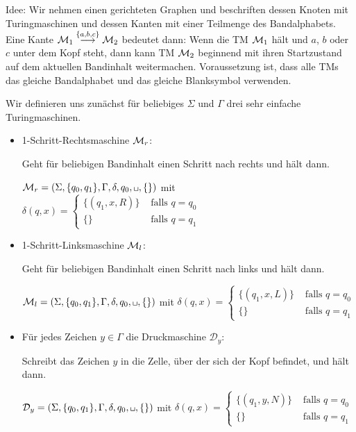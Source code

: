 Idee: Wir nehmen einen gerichteten Graphen und beschriften dessen Knoten mit Turingmaschinen und dessen Kanten mit einer Teilmenge des Bandalphabets.
Eine Kante $\mathcal{M}_1\stackrel{\{a,b,c\}}{\longrightarrow}\mathcal{M}_2$ bedeutet dann:
Wenn die \ac{TM} $\mathcal{M}_1$ hält und $a$, $b$ oder $c$ unter dem Kopf steht, dann kann \ac{TM} $\mathcal{M}_2$ beginnend mit ihren Startzustand auf dem aktuellen Bandinhalt weitermachen.
Voraussetzung ist, dass alle \ac{TM}s das gleiche Bandalphabet und das gleiche Blanksymbol verwenden.

\begin{Bsp}\label{bsp:simpletms} Wir definieren uns zunächst für beliebiges $\Sigma$ und $\Gamma$ drei sehr einfache Turingmaschinen. 
 \begin{itemize}
  \item 1-Schritt-Rechtsmaschine $\mathcal{M}_r$:
  
  Geht für beliebigen Bandinhalt einen Schritt nach rechts und hält dann.
  
  $\M_r=\left(\Sigma,\{q_0,q_1\},\Gamma,\delta,q_0,\blank,\{\}\right)$ mit
  $\delta(q,x)=\begin{cases}\{(q_1, x, R)\} & \text{ falls } q = q_0\\ \{\} & \text{ falls } q = q_1\end{cases}$
  
  \item 1-Schritt-Linksmaschine $\mathcal{M}_l$:
  
  Geht für beliebigen Bandinhalt einen Schritt nach links und hält dann.

  $\M_l=\left(\Sigma,\{q_0,q_1\},\Gamma,\delta,q_0,\blank,\{\}\right)$ mit
  $\delta(q,x)=\begin{cases}\{(q_1, x, L)\} & \text{ falls } q = q_0\\ \{\} & \text{ falls } q = q_1\end{cases}$
  
  \item Für jedes Zeichen $y\in\Gamma$ die Druckmaschine $\mathcal{D}_y$:
  
  Schreibt das Zeichen $y$ in die Zelle, über der sich der Kopf befindet, und hält dann.

  $\mathcal{D}_y=\left(\Sigma,\{q_0,q_1\},\Gamma,\delta,q_0,\blank,\{\}\right)$ mit
  $\delta(q,x)=\begin{cases}\{(q_1, y, N)\} & \text{ falls } q = q_0\\ \{\} & \text{ falls } q = q_1\end{cases}$

 \end{itemize}
\end{Bsp}

